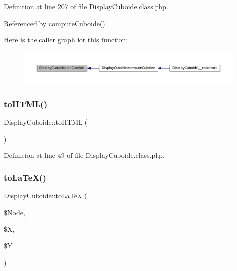 Definition at line 207 of file Display\+Cuboide.\+class.\+php.



Referenced by compute\+Cuboide().

Here is the caller graph for this function\+:\nopagebreak
\begin{figure}[H]
\begin{center}
\leavevmode
\includegraphics[width=350pt]{class_display_cuboide_a0ff1d1fb20501b079f5597ebfaa6f9cf_icgraph}
\end{center}
\end{figure}
\mbox{\label{class_display_cuboide_af79a766a7a6dbbc9edabfddbc5371023}} 
\subsubsection{\texorpdfstring{to\+H\+T\+M\+L()}{toHTML()}}
{\footnotesize\ttfamily Display\+Cuboide\+::to\+H\+T\+ML (\begin{DoxyParamCaption}{ }\end{DoxyParamCaption})}



Definition at line 49 of file Display\+Cuboide.\+class.\+php.

\mbox{\label{class_display_cuboide_a28f97d6c528f98b99d41c0124b4aad0e}} 
\subsubsection{\texorpdfstring{to\+La\+Te\+X()}{toLaTeX()}}
{\footnotesize\ttfamily Display\+Cuboide\+::to\+La\+TeX (\begin{DoxyParamCaption}\item[{}]{\$\+Node,  }\item[{}]{\$X,  }\item[{}]{\$Y }\end{DoxyParamCaption})}



